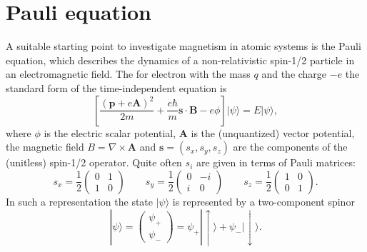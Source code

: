 
%
\section{Pauli equation}
A suitable starting point to investigate magnetism in atomic systems is the Pauli equation, which describes the dynamics of a non-relativistic spin-1/2 particle in an electromagnetic field. The for electron with the mass $q$ and the charge $-e$ the standard form of the time-independent equation is
\begin{equation}
\left[\frac{(\mathbf{p} + e \mathbf{A})^2}{2m} + \frac{e \hbar}{m} \mathbf{s} \cdot \mathbf{B} - e \phi \right] | \psi \rangle = E | \psi \rangle,
\end{equation}
where $\phi$ is the electric scalar potential, $\mathbf{A}$ is the (unquantized) vector potential, the magnetic field $B=\nabla \times \mathbf{A}$ and $\mathbf{s} = (s_x,s_y,s_z)$ are the components of the (unitless) spin-1/2 operator. Quite often $s_i$ are given in terms of Pauli matrices:
\begin{equation}
s_x = \frac{1}{2}\left( \begin{matrix}
0 & 1 \\
1 & 0 
\end{matrix} \right)
\qquad 
s_y = \frac{1}{2}\left( \begin{matrix}
0 & -i \\
i & 0 
\end{matrix} \right) 
\qquad
s_z = \frac{1}{2}\left( \begin{matrix}
1 & 0 \\
0 & 1 
\end{matrix} \right).
\end{equation}
In such a representation the state $| \psi \rangle$ is represented by a two-component spinor
\begin{equation}
| \psi \rangle = \left( \begin{matrix} \psi_+ \\ \psi_- \end{matrix} \right) =
\psi_+ |\uparrow \rangle + \psi_- | \downarrow \rangle
.
\end{equation}
